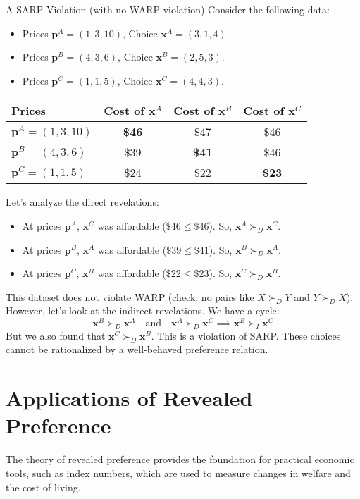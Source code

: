 \begin{examplebox}{A SARP Violation (with no WARP violation)}
Consider the following data:
\begin{itemize}
    \item Prices \(\mathbf{p}^A=(1,3,10)\), Choice \(\mathbf{x}^A=(3,1,4)\).
    \item Prices \(\mathbf{p}^B=(4,3,6)\), Choice \(\mathbf{x}^B=(2,5,3)\).
    \item Prices \(\mathbf{p}^C=(1,1,5)\), Choice \(\mathbf{x}^C=(4,4,3)\).
\end{itemize}
\begin{center}
\begin{tabular}{l|ccc}
\hline
\textbf{Prices} & \textbf{Cost of \(\mathbf{x}^A\)} & \textbf{Cost of \(\mathbf{x}^B\)} & \textbf{Cost of \(\mathbf{x}^C\)} \\
\hline
\(\mathbf{p}^A = (1,3,10)\) & \textbf{\$46} & \$47 & \$46 \\
\(\mathbf{p}^B = (4,3,6)\) & \$39 & \textbf{\$41} & \$46 \\
\(\mathbf{p}^C = (1,1,5)\) & \$24 & \$22 & \textbf{\$23} \\
\hline
\end{tabular}
\end{center}
Let's analyze the direct revelations:
\begin{itemize}
    \item At prices \(\mathbf{p}^A\), \(\mathbf{x}^C\) was affordable (\(\$46 \leq \$46\)). So, \(\mathbf{x}^A \succ_D \mathbf{x}^C\).
    \item At prices \(\mathbf{p}^B\), \(\mathbf{x}^A\) was affordable (\(\$39 \leq \$41\)). So, \(\mathbf{x}^B \succ_D \mathbf{x}^A\).
    \item At prices \(\mathbf{p}^C\), \(\mathbf{x}^B\) was affordable (\(\$22 \leq \$23\)). So, \(\mathbf{x}^C \succ_D \mathbf{x}^B\).
\end{itemize}
This dataset does not violate WARP (check: no pairs like \(X \succ_D Y\) and \(Y \succ_D X\)). However, let's look at the indirect revelations. We have a cycle:
\[
\mathbf{x}^B \succ_D \mathbf{x}^A \quad \text{and} \quad \mathbf{x}^A \succ_D \mathbf{x}^C \implies \mathbf{x}^B \succ_I \mathbf{x}^C
\]
But we also found that \(\mathbf{x}^C \succ_D \mathbf{x}^B\). This is a violation of SARP. These choices cannot be rationalized by a well-behaved preference relation.
\end{examplebox}

\section{Applications of Revealed Preference}
The theory of revealed preference provides the foundation for practical economic tools, such as index numbers, which are used to measure changes in welfare and the cost of living.

